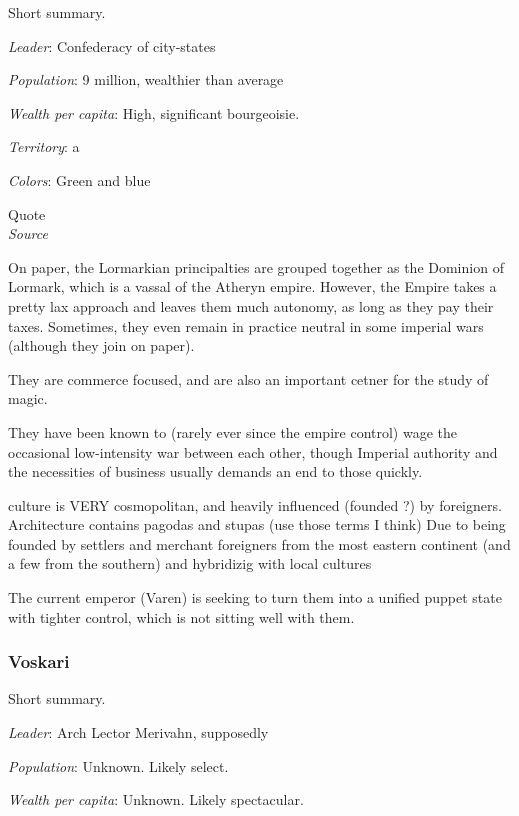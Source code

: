 Short summary.

\textit{Leader}: Confederacy of city-states

\textit{Population}: 9 million, wealthier than average

\textit{Wealth per capita}: High, significant bourgeoisie.

\textit{Territory}: a
    
\textit{Colors}: Green and blue


\begin{rpg-quotebox}
Quote \\ \textendash \textit{Source}
\end{rpg-quotebox}

On paper, the Lormarkian principalties are grouped together as the Dominion of Lormark, which is a vassal of the Atheryn empire. However, the Empire takes a pretty lax approach and leaves them much autonomy, as long as they pay their taxes. Sometimes, they even remain in practice neutral in some imperial wars (although they join on paper). 

They are commerce focused, and are also an important cetner for the study of magic.

They have been known to (rarely ever since the empire control) wage the occasional low-intensity war between each other, though Imperial authority and the necessities of business usually demands an end to those quickly.

culture is  VERY cosmopolitan, and heavily influenced (founded ?) by foreigners. Architecture contains pagodas and stupas (use those terms I think) Due to being founded by settlers and merchant foreigners from the most eastern continent (and a few from the southern) and hybridizig with local cultures


The current emperor (Varen) is seeking to turn them into a unified puppet state with tighter control, which is not sitting well with them.

	

\subsubsection{Voskari}

Short summary.


\textit{Leader}: Arch Lector Merivahn, supposedly

\textit{Population}: Unknown. Likely select.

\textit{Wealth per capita}: Unknown. Likely spectacular.

